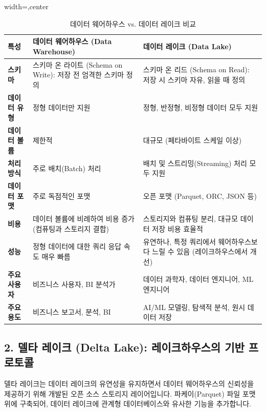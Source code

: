 \documentclass[11pt,a4paper]{article}
\begin{document}
\begin{table}[htbp]
\centering
\caption{데이터 웨어하우스 vs. 데이터 레이크 비교}
\label{tab:warehouse_vs_lake}
\begin{adjustbox}{width=\textwidth,center}
\begin{tabular}{p{3cm} p{6cm} p{6cm}}
\toprule
\textbf{특성} & \textbf{데이터 웨어하우스 (Data Warehouse)} & \textbf{데이터 레이크 (Data Lake)} \\
\midrule
\textbf{스키마} & 스키마 온 라이트 (Schema on Write): 저장 전 엄격한 스키마 정의 & 스키마 온 리드 (Schema on Read): 저장 시 스키마 자유, 읽을 때 정의 \\
\textbf{데이터 유형} & 정형 데이터만 지원 & 정형, 반정형, 비정형 데이터 모두 지원 \\
\textbf{데이터 볼륨} & 제한적 & 대규모 (페타바이트 스케일 이상) \\
\textbf{처리 방식} & 주로 배치(Batch) 처리 & 배치 및 스트리밍(Streaming) 처리 모두 지원 \\
\textbf{데이터 포맷} & 주로 독점적인 포맷 & 오픈 포맷 (Parquet, ORC, JSON 등) \\
\textbf{비용} & 데이터 볼륨에 비례하여 비용 증가 (컴퓨팅과 스토리지 결합) & 스토리지와 컴퓨팅 분리, 대규모 데이터 저장 비용 효율적 \\
\textbf{성능} & 정형 데이터에 대한 쿼리 응답 속도 매우 빠름 & 유연하나, 특정 쿼리에서 웨어하우스보다 느릴 수 있음 (레이크하우스에서 개선) \\
\textbf{주요 사용자} & 비즈니스 사용자, BI 분석가 & 데이터 과학자, 데이터 엔지니어, ML 엔지니어 \\
\textbf{주요 용도} & 비즈니스 보고서, 분석, BI & AI/ML 모델링, 탐색적 분석, 원시 데이터 저장 \\
\bottomrule
\end{tabular}
\end{adjustbox}
\end{table}

\subsection*{2. 델타 레이크 (Delta Lake): 레이크하우스의 기반 프로토콜}

델타 레이크는 데이터 레이크의 유연성을 유지하면서 데이터 웨어하우스의 신뢰성을 제공하기 위해 개발된 오픈 소스 스토리지 레이어입니다. 파케이(Parquet) 파일 포맷 위에 구축되어, 데이터 레이크에 관계형 데이터베이스와 유사한 기능을 추가합니다.
\end{document}
